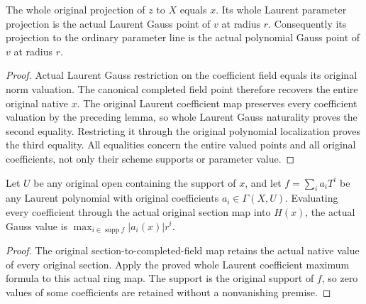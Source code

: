\begin{theorem}\label{thm:native-point-laurent-gauss-projections}
\leanok
{}
The whole original projection of $z$ to $X$ equals $x$. Its whole Laurent
parameter projection is the actual Laurent Gauss point of $v$ at radius
$r$. Consequently its projection to the ordinary parameter line is the
actual polynomial Gauss point of $v$ at radius $r$.
\end{theorem}
\begin{proof}
Actual Laurent Gauss restriction on the coefficient field equals its
original norm valuation. The canonical completed field point therefore
recovers the entire original native $x$. The original Laurent coefficient
map preserves every coefficient valuation by the preceding lemma, so
whole Laurent Gauss naturality proves the second equality. Restricting it
through the original polynomial localization proves the third equality.
All equalities concern the entire valued points and all original
coefficients, not only their scheme supports or parameter value.
\end{proof}

\begin{theorem}\label{thm:native-point-laurent-gauss-section-values}
\leanok
{}
Let $U$ be any original open containing the support of $x$, and let
$f=\sum_i a_iT^i$ be any Laurent polynomial with original coefficients
$a_i\in\Gamma(X,U)$. Evaluating every coefficient through the actual
original section map into $H(x)$, the actual Gauss value is
$\max_{i\in\operatorname{supp}f}|a_i(x)|r^i$.
\end{theorem}
\begin{proof}
The original section-to-completed-field map retains the actual native
value of every original section. Apply the proved whole Laurent
coefficient maximum formula to this actual ring map. The support is the
original support of $f$, so zero values of some coefficients are retained
without a nonvanishing premise.
\end{proof}
